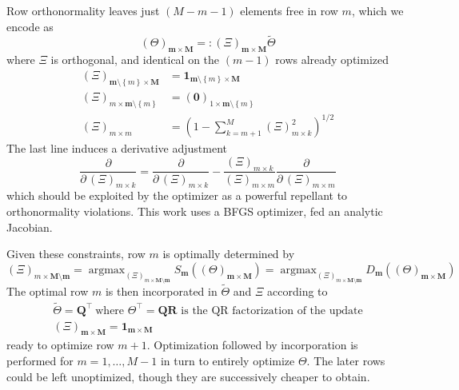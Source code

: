 \documentclass[preprint,12pt]{elsarticle}
\newcommand*{\M}[1]{\ensuremath{#1}\xspace}
\newcommand*{\vr}[1]{\M{\mathbf{#1}}}
\newcommand*{\deqr}{\M{=\mathrel{\mathop:}}}
\newcommand*{\set}[1]{\M{\left\lbrace#1\right\rbrace}}
\DeclareMathOperator*{\argmax}{argmax}
\begin{document}
            Row orthonormality leaves just $(M-m-1)$ elements free in row $m$, which we encode as
            \begin{equation} \label{eq:Method:BO:XiDef}
                (\Theta)_{\vr{m}\times\vr{M}} \deqr (\Xi)_{\vr{m}\times\vr{M}} \tilde{\Theta}
            \end{equation}
            where \(\Xi\) is orthogonal, and identical on the $(m-1)$ rows already optimized
            \begin{equation} \label{eq:Method:BO:XiConstraints}
                \begin{aligned}
                    (\Xi)_{\vr{m}\setminus\set{m}\times\vr{M}} &= \vr{1}_{\vr{m}\setminus\set{m}\times\vr{M}} \\
                    (\Xi)_{m\times\vr{m}\setminus\set{m}} &= (\vr{0})_{1\times\vr{m}\setminus\set{m}} \\
                    (\Xi)_{m\times m} &= \left(1 - \sum_{k=m+1}^{M} (\Xi)_{m\times k}^{2} \right)^{1/2}
                \end{aligned}            
            \end{equation}
            The last line induces a derivative adjustment
            \begin{equation} \label{eq:Method:BO:derivAdjust}
                \frac{\partial}{\partial\,(\Xi)_{m\times k}} = \frac{\partial}{\partial\,(\Xi)_{m\times k}} - 
                \frac{(\Xi)_{m \times k}}{(\Xi)_{m \times m}}\frac{\partial}{\partial\,(\Xi)_{m\times m}}
            \end{equation}
            which should be exploited by the optimizer as a powerful repellant to orthonormality violations.
            This work uses a BFGS optimizer, fed an analytic Jacobian.

            Given these constraints, row $m$ is optimally determined by
            \begin{equation} \label{eq:Method:BO:OptimalRow}
                (\Xi)_{m\times\vr{M}\setminus\vr{m}} = \argmax_{(\Xi)_{m\times\vr{M}\setminus\vr{m}}} S_{\vr{m}}((\Theta)_{\vr{m}\times\vr{M}}) = \argmax_{(\Xi)_{m\times\vr{M}\setminus\vr{m}}} D_{\vr{m}}((\Theta)_{\vr{m}\times\vr{M}})
            \end{equation}
            The optimal row $m$ is then incorporated in $\tilde{\Theta}$ and $\Xi$ according to
            \begin{equation} \label{eq:Method:BO:incorpUpadate}
                \begin{gathered}
                    \tilde{\Theta} = \vr{Q}^{\intercal} \  \text{where } \Theta^{\intercal} = \vr{Q}\vr{R} \text{ is the QR factorization of the update} \\
                    (\Xi)_{\vr{m}\times\vr{M}} = \vr{1}_{\vr{m}\times\vr{M}}
                \end{gathered}
            \end{equation}        
            ready to optimize row $m+1$. 
            Optimization followed by incorporation is performed for $m=1,\ldots, M-1$ in turn to entirely optimize $\Theta$.
            The later rows could be left unoptimized, though they are successively cheaper to obtain.
    
\end{document}
